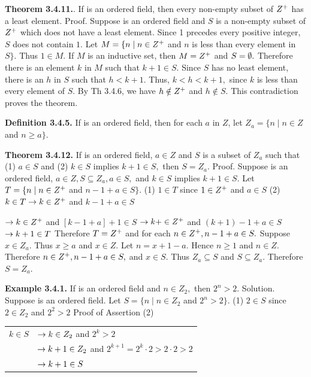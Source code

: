 \begin{large}
\textbf{Theorem 3.4.11.}. If \of  is an ordered field, then every non-empty
subset of $Z^{+}$ has a least element.\nl
 Proof. Suppose \of is an ordered field and $S$ is a non-empty subset of $Z^{+}$ which does not have a least element. Since 1 precedes every positive integer, $S$ does not contain $1$. Let $M=\{n \mid n\in Z^{+} $ and $n$ is less than every element in $S\}.$ Thus $1\in M.$ If $M$ is an inductive set, then $M = Z^{+}$ and $S = \emptyset.$ Therefore there is an element $k$ in $M$ such that $k+1\in S.$ Since $S$ has no least element, there is an $h$ in $S$ such that $h < k+1$. Thus, $k < h < k + 1,$ since $k$ is less than every element of $S$. By Th 3.4.6, we have $h \notin Z^{+}$ and $h \notin S$. This contradiction proves the theorem.\nl


\textbf{Definition 3.4.5.} If \of  is an ordered field, then for each $a$ in $Z$, let $Z_{a} = \{n \mid n\in Z$ and $n \geq a\}.$\nl

\textbf{Theorem 3.4.12.} If \of  is an ordered field, $a\in Z$ and $S$ is a subset of $Z_{a}$ such that (1) $a\in S$ and (2) $k\in S$ implies $k+1\in S,$ then $S =Z_{a}.$ \nl
Proof. Suppose \of  is an ordered field, $a\in Z, S\subseteq Z_{a}, a\in S,$ and $k\in S$ implies $k+1\in S.$ Let $T =\{n \mid n\in Z^{+}$ and $ n-1+a\in S\}.$\nl
(1) $1\in T$ since $1\in Z^{+}$ and $a\in S$\nl
(2) $k\in T \to k\in Z^{+} $ and $k - 1 + a\in S $\nl


\newpage


$\to k\in Z^{+} $ and $[k-1+ a] + 1 \in S$\nl
$\to k + \in Z^{+}$ and $(k+1) - 1 + a\in S$\nl
$\to k+1\in T$\nl
Therefore $T = Z^{+}$ and for each $n\in Z^{+}, n - 1 + a\in S.$ Suppose $x\in Z_{a}$.  Thus $x\geq a$ and $x \in Z.$ Let $n = x + 1 - a.$ Hence $n \geq 1$ and $n\in Z.$ Therefore $n\in Z^{+}, n - 1 + a\in S,$ and $x\in S.$ Thus $Z_{a} \subseteq S$ and $S \subseteq Z_{a}.$ Therefore $S = Z_{a}.$\nl

\textbf{Example 3.4.1.} If \of is an ordered field and $n\in Z_{2},$ then $2^{n}  > 2.$ \nl
 Solution. Suppose \of is an ordered field. Let $S=\{n \mid n\in Z_{2}$ and $2^{n} >2\}.$\nl
(1) $2\in S$ since $2\in Z_{2}$ and $2^{2} >2$\nl
Proof of Assertion (2)\nl
\begin{tabular}{r l}
$k\in S$ & $\to k\in Z_{2}$ and $2^{k} >2$\\
&$\to k+1\in Z_{2}$ and $2^{k+1} = 2^{k} \cdot 2 > 2\cdot 2 > 2 $\\
&$\to k+1\in S$\\
\end{tabular}\\


\end{large}
